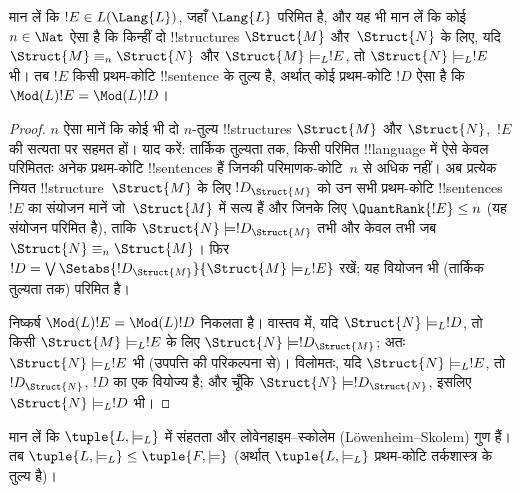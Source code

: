 \documentclass[../../../include/open-logic-section]{subfiles}
\begin{document}


\begin{lem}
मान लें कि $!E \in L(\Lang{L})$, जहाँ $\Lang{L}$ परिमित है, और यह भी
मान लें कि कोई $n \in \Nat$ ऐसा है कि किन्हीं दो !!{structure}s
$\Struct{M}$ और~$\Struct{N}$ के लिए, यदि $\Struct{M} \equiv_n
\Struct{N}$ और $\Struct{M} \models_L !E$, तो $\Struct{N}
\models_L !E$
भी। तब $!E$ किसी प्रथम-कोटि !!{sentence} के तुल्य है, अर्थात् कोई
प्रथम-कोटि $!D$ ऐसा है कि $\Mod(L){!E} = \Mod(L){!D}$।
\end{lem}

\begin{proof} 
$n$ ऐसा मानें कि कोई भी दो $n$-तुल्य !!{structure}s $\Struct{M}$ और
$\Struct{N}$,~$!E$ की सत्यता पर सहमत हों।
 याद करें: तार्किक तुल्यता तक, किसी परिमित
!!{language} में ऐसे केवल परिमिततः अनेक प्रथम-कोटि !!{sentence}s हैं जिनकी
परिमाणक-कोटि~$n$ से अधिक नहीं। अब प्रत्येक नियत
!!{structure}~$\Struct{M}$ के लिए $!D_{\Struct{M}}$ को उन सभी प्रथम-कोटि
!!{sentence}s~$!E$ का संयोजन मानें जो~$\Struct{M}$ में सत्य हैं और जिनके
लिए $\QuantRank{!E} \le n$ (यह संयोजन परिमित है), ताकि $\Struct{N} \models !D_{\Struct{M}}$ तभी और केवल तभी जब $\Struct{N}
\equiv_n \Struct{M}$। फिर $!D = \textstyle\bigvee
\Setabs{!D_{\Struct{M}}}{\Struct{M} \models_L !E}$ रखें; यह वियोजन भी
(तार्किक तुल्यता तक) परिमित है।

निष्कर्ष $\Mod(L){!E} = \Mod(L){!D}$ निकलता है। वास्तव में, यदि
$\Struct{N} \models_L !D$, तो किसी $\Struct{M} \models_L
!E$ के लिए
$\Struct{N} \models !D_{\Struct{M}}$; अतः $\Struct{N} \models_L !E$ भी
(उपपत्ति की परिकल्पना से)। विलोमतः, यदि $\Struct{N} \models_L !E$, तो
$!D_\Struct{N}$, $!D$ का एक वियोज्य है; और चूँकि $\Struct{N}
\models !D_\Struct{N}$, इसलिए $\Struct{N} \models_L !D$ भी।
\end{proof}

\begin{thm}[लिंडस्ट्रॉम (Lindstr\"om) का प्रमेय]
   मान लें कि $\tuple{L, \models_L}$ में संहतता
  और लोवेनहाइम--स्कोलेम (L\"owenheim--Skolem) गुण हैं। तब
  $\tuple{L, \models_L} \le \tuple{F, \models}$ (अर्थात्
  $\tuple{L, \models_L}$ प्रथम-कोटि तर्कशास्त्र के तुल्य है)।
\end{thm}
\end{document}
